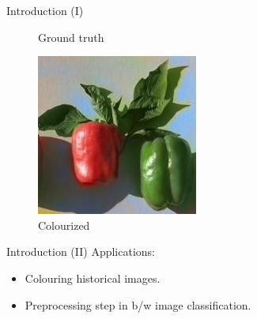 \documentclass{beamer}
\begin{document}
\begin{frame}{Introduction (I)}
\begin{figure}[!htb]
      \caption{Ground truth}
    \endminipage\hfill
      \includegraphics[width=\linewidth]{resources/colored.jpg}
      \caption{Colourized}
    \endminipage
  \end{figure}
\end{frame}

\begin{frame}{Introduction (II)}
  Applications:
    \begin{itemize}
        \item Colouring historical images.
        \item Preprocessing step in b/w image classification.
    \end{itemize}
\end{frame}

\end{document}
